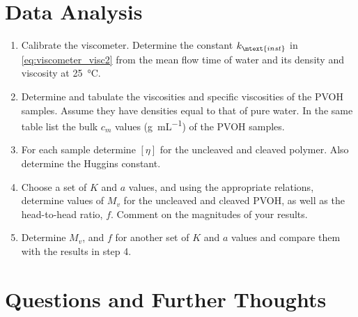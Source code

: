 
\section{Data Analysis} %
\label{sec:data_analysis}

\begin{enumerate}
	\item Calibrate the viscometer. 
	Determine the constant \( k_\mtext{inst} \) in \cref{eq:viscometer_visc2} from the mean flow time of water and its density and viscosity at \qty{25}{\celsius}.
	\item Determine and tabulate the viscosities and specific viscosities of the PVOH samples. 
	Assume they have densities equal to that of pure water. 
	In the same table list the bulk \( c_m \) values (\unit{\g \per \mL}) of the PVOH samples.
	\item For each sample determine \( [\eta] \) for the uncleaved and cleaved polymer. 
	Also determine the Huggins constant.
	\item Choose a set of \( K \) and \( a \) values, and using the appropriate relations, determine values of \( M_v \) for the uncleaved and cleaved PVOH, as well as the head-to-head ratio, \( f \). 
	Comment on the magnitudes of your results.
	\item Determine \( M_v \), and \( f \) for another set of \( K \) and \( a \) values and compare them with the results in step 4.
\end{enumerate}

\section{Questions and Further Thoughts} %
\label{sec:questions_and_further_thoughts}

